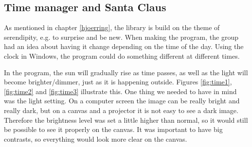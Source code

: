 \subsection{Time manager and Santa Claus}
As mentioned in chapter \ref{hjoerring}, the library is build on the theme of serendipity, e.g. to surprise and be new. When making the program, the group had an idea about having it change depending on the time of the day. Using the clock in Windows, the program could do something different at different times.

In the program, the sun will gradually rise as time passes, as well as the light will become brighter/dimmer, just as it is happening outside. Figures \ref{fig:time1}, \ref{fig:time2} and \ref{fig:time3} illustrate this. One thing we needed to have in mind was the light setting. On a computer screen the image can be really bright and really dark, but on a canvas and a projector it is not easy to see a dark image. Therefore the brightness level was set a little higher than normal, so it would still be possible to see it properly on the canvas. It was important to have big contrasts, so everything would look more clear on the canvas.

